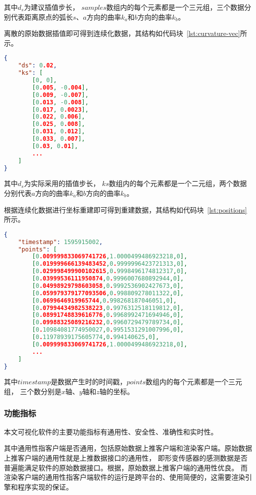 其中$d_s$为建议插值步长，
$samples$数组内的每个元素都是一个三元组，三个数据分别代表距离原点的弧长$s$、$a$方向的曲率$k_a$和$b$方向的曲率$k_b$。

离散的原始数据插值即可得到连续化数据，其结构如代码块~\ref{lst:curvature-vec}所示。

\begin{lstlisting}[language=json,firstnumber=1,label={lst:curvature-vec},caption={插值曲率数据样例}]
{
    "ds": 0.02,
    "ks": [
        [0, 0],
        [0.005, -0.004],
        [0.009, -0.007],
        [0.013, -0.008],
        [0.017, 0.0023],
        [0.022, 0.006],
        [0.025, 0.008],
        [0.031, 0.012],
        [0.033, 0.007],
        [0.03, 0.01],
        ...
    ]
}
\end{lstlisting}

其中$d_s$为实际采用的插值步长，
$ks$数组内的每个元素都是一个二元组，两个数据分别代表$a$方向的曲率$k_a$和$b$方向的曲率$k_b$。

根据连续化数据进行坐标重建即可得到重建数据，其结构如代码块~\ref{lst:positions}所示。

\begin{lstlisting}[language=json,firstnumber=1,label={lst:positions},caption={重建坐标点数据样例}]
{
    "timestamp": 1595915002,
    "points": [
        [0.009999833069741726,1.0000499486923218,0],
        [0.019999666139483452,0.9999996423721313,0],
        [0.029998499900102615,0.9998496174812317,0],
        [0.03999536111950874,0.9996007680892944,0],
        [0.04998929798603058,0.9992536902427673,0],
        [0.059979379177093506,0.998809278011322,0],
        [0.0699646919965744,0.998268187046051,0],
        [0.07994434982538223,0.9976312518119812,0],
        [0.08991748839616776,0.9968992471694946,0],
        [0.09988325089216232,0.9960729479789734,0],
        [0.10984081774950027,0.9951531291007996,0],
        [0.11978939175605774,0.994140625,0],
        [0.009999833069741726,1.0000499486923218,0],
        ...
    ]
}
\end{lstlisting}

其中$timestamp$是数据产生时的时间戳，$points$数组内的每个元素都是一个三元组，
三个数分别是$x$轴、$y$轴和$z$轴的坐标。

\subsubsection{功能指标}
本文可视化软件的主要功能指标有通用性、安全性、准确性和实时性。

其中通用性指客户端是否通用，包括原始数据上推客户端和渲染客户端。原始数据上推客户端的通用性就是上推数据接口的通用性，
即形变传感器的感测数据是否普遍能满足软件的原始数据接口。根据，原始数据上推客户端的通用性优良。
而渲染客户端的通用性指客户端软件的运行是跨平台的、使用简便的，这需要渲染引擎和程序实现的保证。

